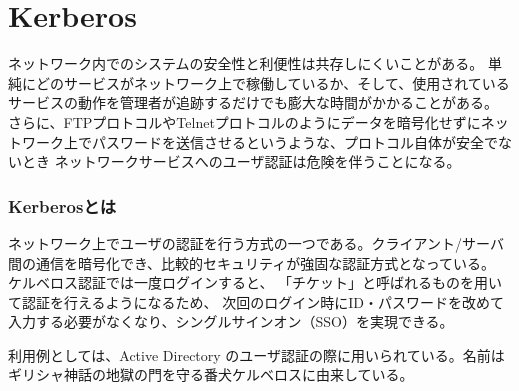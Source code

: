 \documentclass[12pt,a4paper,titlepage]{jreport}
\begin{document}

\section{Kerberos}
ネットワーク内でのシステムの安全性と利便性は共存しにくいことがある。
単純にどのサービスがネットワーク上で稼働しているか、そして、使用されているサービスの動作を管理者が追跡するだけでも膨大な時間がかかることがある。
さらに、FTPプロトコルやTelnetプロトコルのようにデータを暗号化せずにネットワーク上でパスワードを送信させるというような、プロトコル自体が安全でないとき
ネットワークサービスへのユーザ認証は危険を伴うことになる。


\subsubsection*{Kerberosとは}
ネットワーク上でユーザの認証を行う方式の一つである。クライアント/サーバ間の通信を暗号化でき、比較的セキュリティが強固な認証方式となっている。
ケルベロス認証では一度ログインすると、
「チケット」と呼ばれるものを用いて認証を行えるようになるため、
次回のログイン時にID・パスワードを改めて入力する必要がなくなり、シングルサインオン（SSO）を実現できる。\par 
利用例としては、Active Directory のユーザ認証の際に用いられている。名前はギリシャ神話の地獄の門を守る番犬ケルベロスに由来している。
\end{document}
